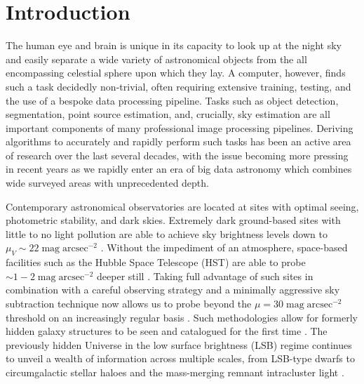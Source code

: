 \documentclass[fleqn,usenatbib,useAMS]{mnras}
\begin{document}


\section{Introduction}
\label{sec:introduction}

The human eye and brain is unique in its capacity to look up at the night sky and easily separate a wide variety of astronomical objects from the all encompassing celestial sphere upon which they lay. A computer, however, finds such a task decidedly non-trivial, often requiring extensive training, testing, and the use of a bespoke data processing pipeline. Tasks such as object detection, segmentation, point source estimation, and, crucially, sky estimation are all important components of many professional image processing pipelines. Deriving algorithms to accurately and rapidly perform such tasks has been an active area of research over the last several decades, with the issue becoming more pressing in recent years as we rapidly enter an era of big data astronomy which combines wide surveyed areas with unprecedented depth. 

Contemporary astronomical observatories are located at sites with optimal seeing, photometric stability, and dark skies. Extremely dark ground-based sites with little to no light pollution are able to achieve sky brightness levels down to $\mu_V\sim22\;\mathrm{mag\;arcsec}^{-2}$ \citep{Garstang1989}. Without the impediment of an atmosphere, space-based facilities such as the Hubble Space Telescope (HST) are able to probe $\sim1-2\;\mathrm{mag\;arcsec}^{-2}$ deeper still \citep[see, e.g.,][and references therein]{Knapen2017}. Taking full advantage of such sites in combination with a careful observing strategy and a minimally aggressive sky subtraction technique now allows us to probe beyond the $\mu=30\;\mathrm{mag\;arcsec}^{-2}$ threshold on an increasingly regular basis \citep{Iodice2016,Trujillo2016}. Such methodologies allow for formerly hidden galaxy structures to be seen and catalogued for the first time \citep[e.g.,][]{Kelvin2018}. The previously hidden Universe in the low surface brightness (LSB) regime continues to unveil a wealth of information across multiple scales, from LSB-type dwarfs \citep{vanDokkum2015,Williams2016} to circumgalactic stellar haloes \citep{D'Souza2014,Wang2019} and the mass-merging remnant intracluster light \citep{Montes2014,Montes2018,Montes2019}. 
\end{document}
